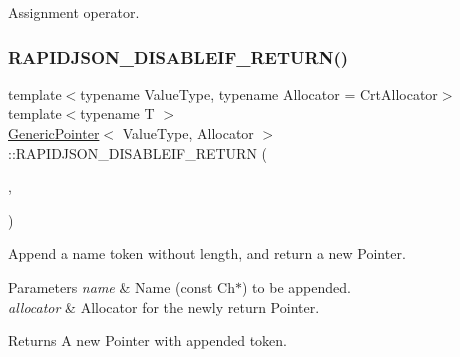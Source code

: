 Assignment operator. 

\mbox{\label{classGenericPointer_aaf4d7d852098878d24188d134182d42f}} 
\subsubsection{\texorpdfstring{R\+A\+P\+I\+D\+J\+S\+O\+N\+\_\+\+D\+I\+S\+A\+B\+L\+E\+I\+F\+\_\+\+R\+E\+T\+U\+R\+N()}{RAPIDJSON\_DISABLEIF\_RETURN()}}
{\footnotesize\ttfamily template$<$typename Value\+Type, typename Allocator = Crt\+Allocator$>$ \\
template$<$typename T $>$ \\
\hyperlink{classGenericPointer}{Generic\+Pointer}$<$ Value\+Type, Allocator $>$\+::R\+A\+P\+I\+D\+J\+S\+O\+N\+\_\+\+D\+I\+S\+A\+B\+L\+E\+I\+F\+\_\+\+R\+E\+T\+U\+RN (\begin{DoxyParamCaption}\item[{(internal\+::\+Not\+Expr$<$ internal\+::\+Is\+Same$<$ typename internal\+::\+Remove\+Const$<$ T $>$\+::\hyperlink{rapidjson_8h_a1d1cfd8ffb84e947f82999c682b666a7}{Type}, \hyperlink{classGenericPointer_ab292356c11b4015c98d21b966b11f285}{Ch} $>$ $>$)}]{,  }\item[{(\hyperlink{classGenericPointer}{Generic\+Pointer}$<$ Value\+Type, Allocator $>$)}]{ }\end{DoxyParamCaption})}



Append a name token without length, and return a new Pointer. 


\begin{DoxyParams}{Parameters}
{\em name} & Name (const Ch$\ast$) to be appended. \\
\hline
{\em allocator} & Allocator for the newly return Pointer. \\
\hline
\end{DoxyParams}
\begin{DoxyReturn}{Returns}
A new Pointer with appended token. 
\end{DoxyReturn}
\mbox{\label{classGenericPointer_a64fd102622f772efefd445cbed56b16e}} 

